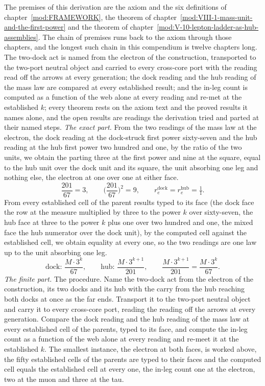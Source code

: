 \begin{chproof}
The premises of this derivation are the axiom and the six definitions of chapter~\ref{mod:FRAMEWORK}, the theorem of chapter~\ref{mod:VIII-1-mass-unit-and-the-first-power} and the theorem of chapter~\ref{mod:V-10-lepton-ladder-as-hub-assemblies}. The chain of premises runs back to the axiom through those chapters, and the longest such chain in this compendium is twelve chapters long.
The two-dock act is named from the electron of the construction, transported to the two-port neutral object and carried to every cross-core port with the reading read off the arrows at every generation; the dock reading and the hub reading of the mass law are compared at every established result; and the in-leg count is computed as a function of the web alone at every reading and re-met at the established $k$; every theorem rests on the axiom text and the proved results it names alone, and the open results are readings the derivation tried and parted at their named steps.
\textit{The exact part.}
From the two readings of the mass law at the electron, the dock reading at the dock-struck first power sixty-seven and the hub reading at the hub first power two hundred and one, by the ratio of the two units, we obtain the parting three at the first power and nine at the square, equal to the hub unit over the dock unit and its square, the unit absorbing one leg and nothing else, the electron at one over one at either face.
\begin{equation}
\frac{201}{67} = 3, \qquad \Big(\frac{201}{67}\Big)^{2} = 9, \qquad r_{e}^{\mathrm{dock}} = r_{e}^{\mathrm{hub}} = \tfrac{1}{1} .
\end{equation}
From every established cell of the parent results typed to its face (the dock face the row at the measure multiplied by three to the power $k$ over sixty-seven, the hub face at three to the power $k$ plus one over two hundred and one, the mixed face the hub numerator over the dock unit), by the computed cell against the established cell, we obtain equality at every one, so the two readings are one law up to the unit absorbing one leg.
\begin{equation}
\text{dock: } \frac{M \cdot 3^{k}}{67}, \qquad \text{hub: } \frac{M \cdot 3^{k+1}}{201}, \qquad \frac{M \cdot 3^{k+1}}{201} = \frac{M \cdot 3^{k}}{67} .
\end{equation}
\textit{The finite part.}
The procedure. Name the two-dock act from the electron of the construction, its two docks and its hub with the carry from the hub reaching both docks at once as the far ends. Transport it to the two-port neutral object and carry it to every cross-core port, reading the reading off the arrows at every generation. Compare the dock reading and the hub reading of the mass law at every established cell of the parents, typed to its face, and compute the in-leg count as a function of the web alone at every reading and re-meet it at the established $k$. The smallest instance, the electron at both faces, is worked above, the fifty established cells of the parents are typed to their faces and the computed cell equals the established cell at every one, the in-leg count one at the electron, two at the muon and three at the tau.

\end{chproof}
